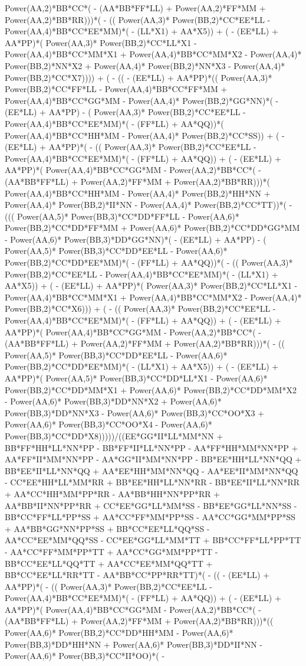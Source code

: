 \documentclass[10pt]{article} %
\begin{document}
{Power(AA,2)*BB*CC*( - (AA*BB*FF*LL) +  Power(AA,2)*FF*MM +  Power(AA,2)*BB*RR)))*( - (( Power(AA,3)* Power(BB,2)*CC*EE*LL -  Power(AA,4)*BB*CC*EE*MM)*( - (LL*X1) + AA*X5)) + ( - (EE*LL) + AA*PP)*( Power(AA,3)* Power(BB,2)*CC*LL*X1 -  Power(AA,4)*BB*CC*MM*X1 +  Power(AA,4)*BB*CC*MM*X2 -  Power(AA,4)* Power(BB,2)*NN*X2 +  Power(AA,4)* Power(BB,2)*NN*X3 -  Power(AA,4)* Power(BB,2)*CC*X7)))) + ( - (( - (EE*LL) + AA*PP)*(( Power(AA,3)* Power(BB,2)*CC*FF*LL -  Power(AA,4)*BB*CC*FF*MM +  Power(AA,4)*BB*CC*GG*MM -  Power(AA,4)* Power(BB,2)*GG*NN)*( - (EE*LL) + AA*PP) - ( Power(AA,3)* Power(BB,2)*CC*EE*LL -  Power(AA,4)*BB*CC*EE*MM)*( - (FF*LL) + AA*QQ))*( Power(AA,4)*BB*CC*HH*MM -  Power(AA,4)* Power(BB,2)*CC*SS)) + ( - (EE*LL) + AA*PP)*( - (( Power(AA,3)* Power(BB,2)*CC*EE*LL -  Power(AA,4)*BB*CC*EE*MM)*( - (FF*LL) + AA*QQ)) + ( - (EE*LL) + AA*PP)*( Power(AA,4)*BB*CC*GG*MM -  Power(AA,2)*BB*CC*( - (AA*BB*FF*LL) +  Power(AA,2)*FF*MM +  Power(AA,2)*BB*RR)))*( Power(AA,4)*BB*CC*HH*MM -  Power(AA,4)* Power(BB,2)*HH*NN +  Power(AA,4)* Power(BB,2)*II*NN -  Power(AA,4)* Power(BB,2)*CC*TT))*( - ((( Power(AA,5)* Power(BB,3)*CC*DD*FF*LL -  Power(AA,6)* Power(BB,2)*CC*DD*FF*MM +  Power(AA,6)* Power(BB,2)*CC*DD*GG*MM -  Power(AA,6)* Power(BB,3)*DD*GG*NN)*( - (EE*LL) + AA*PP) - ( Power(AA,5)* Power(BB,3)*CC*DD*EE*LL -  Power(AA,6)* Power(BB,2)*CC*DD*EE*MM)*( - (FF*LL) + AA*QQ))*( - (( Power(AA,3)* Power(BB,2)*CC*EE*LL -  Power(AA,4)*BB*CC*EE*MM)*( - (LL*X1) + AA*X5)) + ( - (EE*LL) + AA*PP)*( Power(AA,3)* Power(BB,2)*CC*LL*X1 -  Power(AA,4)*BB*CC*MM*X1 +  Power(AA,4)*BB*CC*MM*X2 -  Power(AA,4)* Power(BB,2)*CC*X6))) + ( - (( Power(AA,3)* Power(BB,2)*CC*EE*LL -  Power(AA,4)*BB*CC*EE*MM)*( - (FF*LL) + AA*QQ)) + ( - (EE*LL) + AA*PP)*( Power(AA,4)*BB*CC*GG*MM -  Power(AA,2)*BB*CC*( - (AA*BB*FF*LL) +  Power(AA,2)*FF*MM +  Power(AA,2)*BB*RR)))*( - (( Power(AA,5)* Power(BB,3)*CC*DD*EE*LL -  Power(AA,6)* Power(BB,2)*CC*DD*EE*MM)*( - (LL*X1) + AA*X5)) + ( - (EE*LL) + AA*PP)*( Power(AA,5)* Power(BB,3)*CC*DD*LL*X1 -  Power(AA,6)* Power(BB,2)*CC*DD*MM*X1 +  Power(AA,6)* Power(BB,2)*CC*DD*MM*X2 -  Power(AA,6)* Power(BB,3)*DD*NN*X2 +  Power(AA,6)* Power(BB,3)*DD*NN*X3 -  Power(AA,6)* Power(BB,3)*CC*OO*X3 +  Power(AA,6)* Power(BB,3)*CC*OO*X4 -  Power(AA,6)* Power(BB,3)*CC*DD*X8)))))/((EE*GG*II*LL*MM*NN + BB*FF*HH*LL*NN*PP - BB*FF*II*LL*NN*PP - AA*FF*HH*MM*NN*PP + AA*FF*II*MM*NN*PP - AA*GG*II*MM*NN*PP - BB*EE*HH*LL*NN*QQ + BB*EE*II*LL*NN*QQ + AA*EE*HH*MM*NN*QQ - AA*EE*II*MM*NN*QQ - CC*EE*HH*LL*MM*RR + BB*EE*HH*LL*NN*RR - BB*EE*II*LL*NN*RR + AA*CC*HH*MM*PP*RR - AA*BB*HH*NN*PP*RR + AA*BB*II*NN*PP*RR + CC*EE*GG*LL*MM*SS - BB*EE*GG*LL*NN*SS - BB*CC*FF*LL*PP*SS + AA*CC*FF*MM*PP*SS - AA*CC*GG*MM*PP*SS + AA*BB*GG*NN*PP*SS + BB*CC*EE*LL*QQ*SS - AA*CC*EE*MM*QQ*SS - CC*EE*GG*LL*MM*TT + BB*CC*FF*LL*PP*TT - AA*CC*FF*MM*PP*TT + AA*CC*GG*MM*PP*TT - BB*CC*EE*LL*QQ*TT + AA*CC*EE*MM*QQ*TT + BB*CC*EE*LL*RR*TT - AA*BB*CC*PP*RR*TT)*( - (( - (EE*LL) + AA*PP)*( - (( Power(AA,3)* Power(BB,2)*CC*EE*LL -  Power(AA,4)*BB*CC*EE*MM)*( - (FF*LL) + AA*QQ)) + ( - (EE*LL) + AA*PP)*( Power(AA,4)*BB*CC*GG*MM -  Power(AA,2)*BB*CC*( - (AA*BB*FF*LL) +  Power(AA,2)*FF*MM +  Power(AA,2)*BB*RR)))*(( Power(AA,6)* Power(BB,2)*CC*DD*HH*MM -  Power(AA,6)* Power(BB,3)*DD*HH*NN +  Power(AA,6)* Power(BB,3)*DD*II*NN -  Power(AA,6)* Power(BB,3)*CC*II*OO)*( - }
\end{document}
